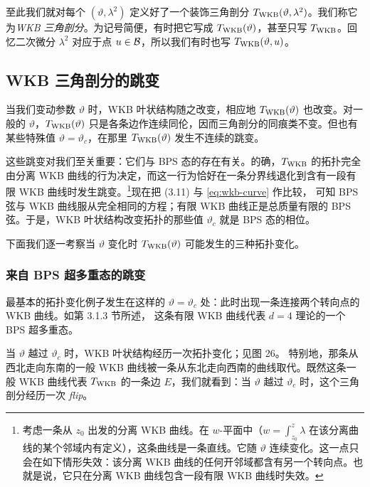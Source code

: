 至此我们就对每个 $(\vartheta, \lambda^2)$ 定义好了一个装饰三角剖分 $T_{\rm WKB}(\vartheta, \lambda^2)$。我们称它为\emph{WKB 三角剖分}。为记号简便，有时把它写成 $T_{\rm WKB}(\vartheta)$，甚至只写 $T_{\rm WKB}$。回忆二次微分 $\lambda^2$ 对应于点 $u \in \mathcal{B}$，所以我们有时也写 $T_{\rm WKB}(\vartheta, u)$。

\subsection{WKB 三角剖分的跳变}\label{subsec:Jumps-WKB-triang}

当我们变动参数 $\vartheta$ 时，WKB 叶状结构随之改变，相应地 $T_{\rm WKB}(\vartheta)$ 也改变。对一般的 $\vartheta$，$T_{\rm WKB}(\vartheta)$ 只是各条边作连续同伦，因而三角剖分的同痕类不变。但也有某些特殊值 $\vartheta = \vartheta_c$，在那里 $T_{\rm WKB}(\vartheta)$ 发生不连续的跳变。

这些跳变对我们至关重要：它们与 BPS 态的存在有关。的确，$T_{\rm WKB}$ 的拓扑完全由分离 WKB 曲线的行为决定，而这一行为恰好在一条分界线退化到含有一段有限 WKB 曲线时发生跳变。\footnote{考虑一条从 $z_0$ 出发的分离 WKB 曲线。在 $w$-平面中（$w = \int_{z_0}^z \lambda$ 在该分离曲线的某个邻域内有定义），这条曲线是一条直线。它随 $\vartheta$ 连续变化。这一点只会在如下情形失效：该分离 WKB 曲线的任何开邻域都含有另一个转向点。也就是说，它只在分离 WKB 曲线包含一段有限 WKB 曲线时失效。}现在把 (3.11) 与 \eqref{eq:wkb-curve} 作比较，%
可知 BPS 弦与 WKB 曲线服从完全相同的方程；有限 WKB 曲线正是总质量有限的 BPS 弦。于是，WKB 叶状结构改变拓扑的那些值 $\vartheta_c$ 就是 BPS 态的相位。

下面我们逐一考察当 $\vartheta$ 变化时 $T_{\rm WKB}(\vartheta)$ 可能发生的三种拓扑变化。

\subsubsection{来自 BPS 超多重态的跳变} \label{sec:hyper-jump}

最基本的拓扑变化例子发生在这样的 $\vartheta = \vartheta_c$ 处：此时出现一条连接两个转向点的 WKB 曲线。如第 3.1.3 节所述，%
这条有限 WKB 曲线代表 $d=4$ 理论的一个 BPS 超多重态。

当 $\vartheta$ 越过 $\vartheta_c$ 时，WKB 叶状结构经历一次拓扑变化；见图 26。%
特别地，那条从西北走向东南的一般 WKB 曲线被一条从东北走向西南的曲线取代。既然这条一般 WKB 曲线代表 $T_{\rm WKB}$ 的一条边 $E$，我们就看到：当 $\vartheta$ 越过 $\vartheta_c$ 时，这个三角剖分经历一次 \emph{flip}。

